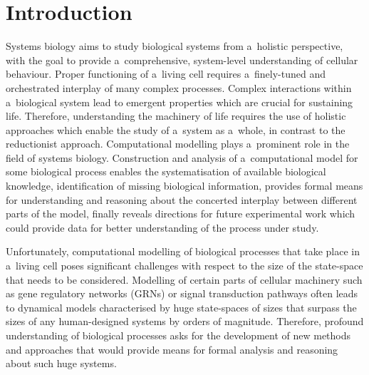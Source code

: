 \documentclass[runningheads,a4paper]{llncs}
\begin{document}
\section{Introduction}
\label{sec:intro}
Systems biology aims to study biological systems from a~holistic perspective, with the goal to
provide a~comprehensive, system-level understanding of cellular behaviour. Proper functioning of
a~living cell requires a~finely-tuned and orchestrated interplay of many complex processes.
Complex interactions within a~biological system lead to emergent properties which are crucial
for sustaining life. Therefore, understanding the machinery of life requires the use of holistic
approaches which enable the study of a~system as a~whole, in contrast to the reductionist
approach.
Computational modelling plays a~prominent role in the field of systems biology. Construction and
analysis of a~computational model for some biological process enables the systematisation
of available biological knowledge, identification of missing biological information, provides
formal means for understanding and reasoning about the concerted interplay between different parts
of the model, finally reveals directions for future experimental work which could
provide data for better understanding of the process under study.

Unfortunately, computational modelling of biological processes that take place in a~living cell
poses significant challenges with respect to the size of the state-space that needs to be
considered. Modelling of certain parts of cellular machinery such as gene regulatory networks
(GRNs) or signal transduction pathways often leads to dynamical models characterised by huge
state-spaces of sizes that surpass the sizes of any human-designed systems by orders of magnitude.
Therefore, profound understanding of biological processes asks for the development of new methods
and approaches that would provide means for formal analysis and reasoning about such huge systems.
\end{document}
